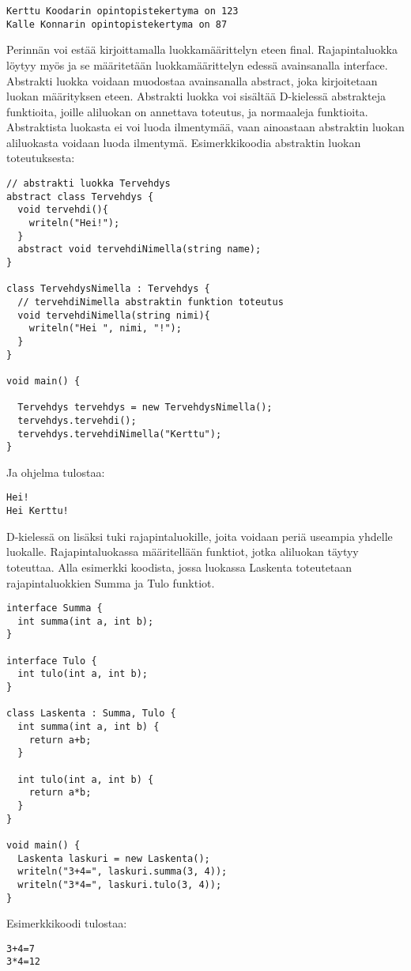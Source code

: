 \documentclass[11pt,oneside,a4paper]{article}
\begin{document}
\begin{verbatim}
Kerttu Koodarin opintopistekertyma on 123
Kalle Konnarin opintopistekertyma on 87
\end{verbatim}
Perinnän voi estää kirjoittamalla luokkamäärittelyn eteen final. Rajapintaluokka löytyy myös ja se määritetään luokkamäärittelyn edessä avainsanalla interface. 
Abstrakti luokka voidaan muodostaa avainsanalla abstract, joka kirjoitetaan luokan määrityksen eteen. Abstrakti luokka voi sisältää D-kielessä abstrakteja funktioita, joille aliluokan on annettava toteutus, ja normaaleja funktioita. Abstraktista luokasta ei voi luoda ilmentymää, vaan ainoastaan abstraktin luokan aliluokasta voidaan luoda ilmentymä. Esimerkkikoodia abstraktin luokan toteutuksesta:
\begin{verbatim}
// abstrakti luokka Tervehdys
abstract class Tervehdys { 
  void tervehdi(){ 
    writeln("Hei!"); 
  } 
  abstract void tervehdiNimella(string name); 
} 

class TervehdysNimella : Tervehdys { 
  // tervehdiNimella abstraktin funktion toteutus
  void tervehdiNimella(string nimi){ 
    writeln("Hei ", nimi, "!"); 
  } 
} 

void main() {

  Tervehdys tervehdys = new TervehdysNimella(); 
  tervehdys.tervehdi(); 
  tervehdys.tervehdiNimella("Kerttu"); 
}
\end{verbatim}
Ja ohjelma tulostaa:
\begin{verbatim}
Hei!
Hei Kerttu!
\end{verbatim}

D-kielessä on lisäksi tuki rajapintaluokille, joita voidaan periä useampia yhdelle luokalle. Rajapintaluokassa määritellään funktiot, jotka aliluokan täytyy toteuttaa. Alla esimerkki koodista, jossa luokassa Laskenta toteutetaan rajapintaluokkien Summa ja Tulo funktiot.

\begin{verbatim}
interface Summa { 
  int summa(int a, int b); 
} 

interface Tulo {
  int tulo(int a, int b);
}

class Laskenta : Summa, Tulo { 
  int summa(int a, int b) { 
    return a+b;
  } 

  int tulo(int a, int b) {
    return a*b;
  }
} 

void main() {
  Laskenta laskuri = new Laskenta();
  writeln("3+4=", laskuri.summa(3, 4));
  writeln("3*4=", laskuri.tulo(3, 4));
}
\end{verbatim}
Esimerkkikoodi tulostaa:
\begin{verbatim}
3+4=7
3*4=12
\end{verbatim}
\end{document}
